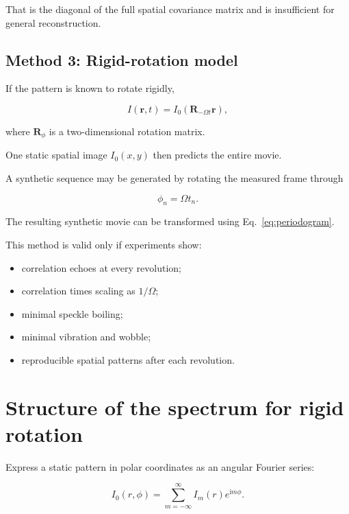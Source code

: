 \documentclass[11pt]{article}
\newcommand{\ii}{\mathrm{i}}
\newcommand{\rvec}{\mathbf{r}}
\begin{document}
That is the diagonal of the full spatial covariance matrix and is
insufficient for general reconstruction.

\subsection{Method 3: Rigid-rotation model}

If the pattern is known to rotate rigidly,

\begin{equation}
    I(\rvec,t)
    =
    I_0\left(
        \mathbf{R}_{-\Omega t}\rvec
    \right),
    \label{eq:rigid_rotation}
\end{equation}

where $\mathbf{R}_{\phi}$ is a two-dimensional rotation matrix.

One static spatial image $I_0(x,y)$ then predicts the entire movie.

A synthetic sequence may be generated by rotating the measured frame through

\begin{equation}
    \phi_n=\Omega t_n.
\end{equation}

The resulting synthetic movie can be transformed using
Eq.~\eqref{eq:periodogram}.

This method is valid only if experiments show:

\begin{itemize}
    \item correlation echoes at every revolution;
    \item correlation times scaling as $1/\Omega$;
    \item minimal speckle boiling;
    \item minimal vibration and wobble;
    \item reproducible spatial patterns after each revolution.
\end{itemize}

\section{Structure of the spectrum for rigid rotation}

Express a static pattern in polar coordinates as an angular Fourier series:

\begin{equation}
    I_0(r,\phi)
    =
    \sum_{m=-\infty}^{\infty}
    I_m(r)e^{\ii m\phi}.
\end{equation}
\end{document}

